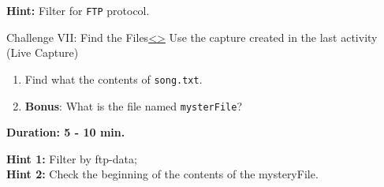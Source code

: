 \documentclass[12pt]{extarticle}
\newenvironment{instructionblock}{\Large\bgroup}{\egroup}
\begin{document}
	\noindent
	\textbf{Hint:} Filter for \texttt{FTP} protocol.\\
	
	
	
	
	\pagebreak
	\begin{slide}{Challenge VII: Find the Files}{\hyperref[slide 33]{\textless}\hyperref[slide 35]{\textgreater}}
		\vskip 5pt
		\begin{instructionblock}
			Use the capture created in the last activity (Live Capture)
			\begin{enumerate}
				\item Find what the contents of \texttt{song.txt}.
				\item \textbf{Bonus}: What is the file named \texttt{mysterFile}?
			\end{enumerate}
			
			\vspace{35mm}
			\begin{center}
				 \textbf{Duration: 5 - 10 min.}
			\end{center}
		\end{instructionblock}
	\end{slide}
	\vfill
	
	\noindent
	\textbf{Hint 1:} Filter by ftp-data;\\
	\textbf{Hint 2:} Check the beginning of the contents of the mysteryFile.
	
	
	
\end{document}
